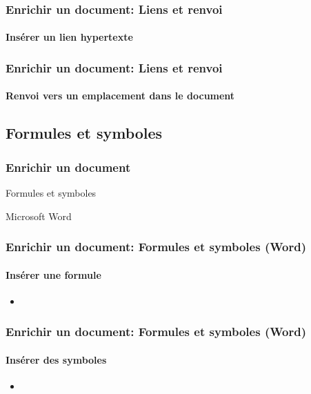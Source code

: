 \documentclass[xcolor=table]{beamer}
\begin{document}
\begin{frame}
\frametitle{Enrichir un document: Liens et renvoi}
\framesubtitle{Insérer un lien hypertexte}

\end{frame}

\begin{frame}
\frametitle{Enrichir un document: Liens et renvoi}
\framesubtitle{Renvoi vers un emplacement dans le document}

\end{frame}

\subsection{Formules et symboles}

\begin{frame}
\frametitle{Enrichir un document}

\begin{center}
	Formules et symboles 
	
	Microsoft Word
\end{center}

\end{frame}

\begin{frame}
\frametitle{Enrichir un document: Formules et symboles (Word)}
\framesubtitle{Insérer une formule}


\begin{minipage}{0.76\textwidth}
	\begin{itemize}
		\item 
	\end{itemize}
\end{minipage}
\begin{minipage}{0.23\textwidth}
		
\end{minipage}

\end{frame}

\begin{frame}
\frametitle{Enrichir un document: Formules et symboles (Word)}
\framesubtitle{Insérer des symboles}

\begin{minipage}{0.50\textwidth}
	\begin{itemize}
		\item 
	\end{itemize}
\end{minipage}
\begin{minipage}{0.49\textwidth}
	
\end{minipage}

\end{frame}
\end{document}
